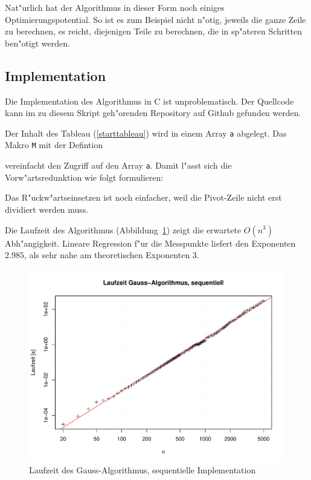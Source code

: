 Nat"urlich hat der Algorithmus in dieser Form noch einiges
Optimierungspotential. So ist es zum Beispiel nicht n"otig, jeweils
die ganze Zeile zu berechnen, es reicht, diejenigen Teile zu
berechnen, die in sp"ateren Schritten ben"otigt werden. 

\subsection{Implementation}
Die Implementation des Algorithmus in C ist unproblematisch. Der Quellcode
kann im zu diesem Skript geh"orenden Repository auf Github gefunden
werden. 

Der Inhalt des Tableau (\ref{starttableau}) wird in einem Array {\tt a}
abgelegt. Das Makro {\tt M} mit der Defintion

vereinfacht den Zugriff auf den Array {\tt a}. Damit l"asst sich die 
Vorw"artsredunktion wie folgt formulieren:

Das R"uckw"artseinsetzen ist noch einfacher, weil die Pivot-Zeile
nicht erst dividiert werden muss.

Die Laufzeit des Algorithmus (Abbildung~\ref{laufzeit-sequentiell})
zeigt die erwartete $O(n^3)$ Abh"angigkeit. Lineare Regression f"ur 
die Messpunkte liefert den Exponenten $2.985$, als sehr nahe am
theoretischen Exponenten 3.
\begin{figure}
\begin{center}
\includegraphics[width=\hsize]{images/gauss-seq.pdf}
\end{center}
\caption{Laufzeit des Gauss-Algorithmus, sequentielle Implementation
\label{laufzeit-sequentiell}}
\end{figure}

